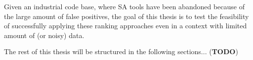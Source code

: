 

Given an industrial code base, where SA tools have been abandoned because of the large amount of false positives, the goal of this thesis is to test the feasibility of successfully applying these ranking approaches even in a context with limited amount of (or noisy) data.



The rest of this thesis will be structured in the following sections... (\textbf{TODO})




